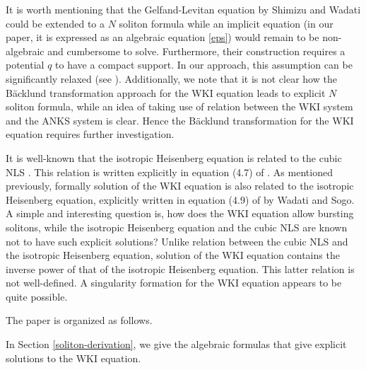 \documentclass[11pt]{article}
\begin{document}
It is worth mentioning that the Gelfand-Levitan equation by Shimizu and Wadati \cite{Shimizu-Wadati-1980} could be extended to a $N$ soliton formula while an implicit equation (in our paper, it is expressed as an algebraic equation \eqref{eps}) would remain to be non-algebraic and cumbersome to solve. Furthermore, their construction requires a potential $q$ to have a compact support. In our approach, this assumption can be significantly relaxed (see \cite{Shimabukuro-present}). Additionally, we note that it is not clear how the B\"{a}cklund transformation approach for the WKI equation leads to explicit $N$ soliton formula, while an idea of taking use of relation between the WKI system and the ANKS system is clear. Hence the B\"{a}cklund transformation for the WKI equation requires further investigation. 

It is well-known that the isotropic Heisenberg equation is related to the cubic NLS \cite{Zakharov-Takhtadzhyan-1978, Zakharov-Mikhailov-1978}. This relation is written explicitly in equation (4.7) of \cite{Wadati-Sogo-1983}.
 As mentioned previously, formally solution of the WKI equation is also related to the isotropic Heisenberg equation, explicitly written in equation (4.9) of \cite{Wadati-Sogo-1983} by Wadati and Sogo. A simple and interesting question is, how does the WKI equation allow bursting solitons, while the isotropic Heisenberg equation and the cubic NLS are known not to have such explicit solutions? Unlike relation between the cubic NLS and the isotropic Heisenberg equation, solution of the WKI equation contains the inverse power of that of the isotropic Heisenberg equation. This latter relation is not well-defined. A singularity formation for the WKI equation appears to be quite possible.


 
The paper is organized as follows.

 In Section \ref{soliton-derivation}, we give the algebraic formulas that give explicit solutions to the WKI equation.
 
 
  
\end{document}

